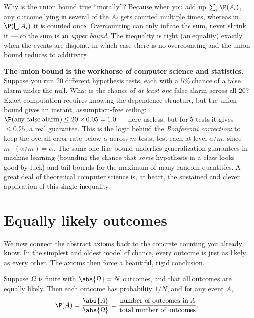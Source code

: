 \begin{intuitionbox}
Why is the union bound true ``morally''? Because when you add up
$\sum_i \P(A_i)$, any outcome lying in several of the $A_i$ gets counted multiple
times, whereas in $\P(\bigcup A_i)$ it is counted once. Overcounting can only
inflate the sum, never shrink it --- so the sum is an \emph{upper bound}. The
inequality is tight (an equality) exactly when the events are disjoint, in which
case there is no overcounting and the union bound reduces to additivity.
\end{intuitionbox}

\begin{applicationbox}
\textbf{The union bound is the workhorse of computer science and statistics.}
Suppose you run $20$ different hypothesis tests, each with a $5\%$ chance of a
false alarm under the null. What is the chance of \emph{at least one} false alarm
across all $20$? Exact computation requires knowing the dependence structure, but
the union bound gives an instant, assumption-free ceiling:
$\P(\text{any false alarm}) \le 20 \times 0.05 = 1.0$ --- here useless, but for
$5$ tests it gives $\le 0.25$, a real guarantee. This is the logic behind the
\emph{Bonferroni correction}: to keep the overall error rate below $\alpha$ across
$m$ tests, test each at level $\alpha/m$, since
$m \cdot (\alpha/m) = \alpha$. The same one-line bound underlies generalization
guarantees in machine learning (bounding the chance that \emph{some} hypothesis
in a class looks good by luck) and tail bounds for the maximum of many random
quantities. A great deal of theoretical computer science is, at heart, the
sustained and clever application of this single inequality.
\end{applicationbox}

\section{Equally likely outcomes}
\label{ch03:equally-likely}

We now connect the abstract axioms back to the concrete counting you already
know. In the simplest and oldest model of chance, every outcome is just as likely
as every other. The axioms then force a beautiful, rigid conclusion.

\begin{proposition}
\label{ch03:prop-classical}
Suppose $\Omega$ is finite with $\abs{\Omega} = N$ outcomes, and that all
outcomes are equally likely. Then each outcome has probability $1/N$, and for any
event $A$,
\[
\P(A) = \frac{\abs{A}}{\abs{\Omega}} = \frac{\text{number of outcomes in } A}{\text{total number of outcomes}}.
\]
\end{proposition}

